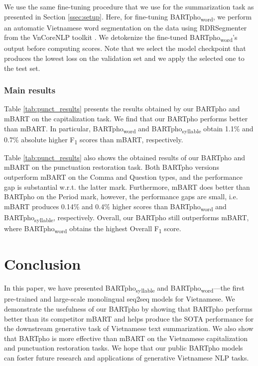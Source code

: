 \documentclass[a4paper]{article}
\begin{document}
We use the same fine-tuning procedure that we use for the  summarization task as presented in Section \ref{ssec:setup}. Here, for fine-tuning BARTpho\textsubscript{word}, we perform an automatic Vietnamese word segmentation on the data using RDRSegmenter \cite{rdrsegmenter} from the VnCoreNLP toolkit \cite{vu-etal-2018-vncorenlp}. We detokenize the
fine-tuned BARTpho\textsubscript{word}’s output before computing scores. Note that we select the model checkpoint that produces the lowest loss on the validation set and we apply the selected one to the test set.


\subsubsection{Main results}
Table \ref{tab:punct_results} presents the results obtained by our BARTpho and mBART  on the capitalization task. We find that our BARTpho performs better than mBART. In particular, BARTpho\textsubscript{word}  and BARTpho\textsubscript{syllable}  obtain  1.1\% and 0.7\% absolute higher F\textsubscript{1} scores than mBART, respectively.


Table \ref{tab:punct_results} also shows the obtained results of our BARTpho and mBART on the punctuation restoration task. Both BARTpho versions outperform mBART on the Comma and Question types, and the performance gap is substantial w.r.t. the latter mark. Furthermore, mBART does better than BARTpho on the Period mark, however, the performance gaps are small, i.e.  mBART produces 0.14\% and 0.4\% higher scores than BARTpho\textsubscript{word} and BARTpho\textsubscript{syllable}, respectively. Overall, our BARTpho still  outperforms mBART, where BARTpho\textsubscript{word} obtains the highest Overall F\textsubscript{1} score. 


\section{Conclusion}

In this paper, we have presented BARTpho\textsubscript{syllable} and BARTpho\textsubscript{word}---the first pre-trained and large-scale monolingual seq2seq models for Vietnamese. We demonstrate the usefulness of our BARTpho by showing that BARTpho performs better than its competitor mBART and helps produce the SOTA performance for the downstream generative task of Vietnamese text summarization. We also show that BARTpho is more effective than mBART on the Vietnamese capitalization and punctuation restoration tasks. We hope that our public BARTpho models can foster future research and applications of generative Vietnamese NLP tasks.



\end{document}
